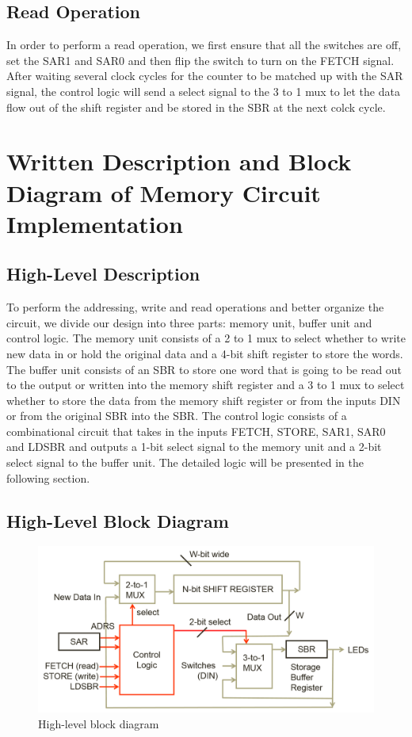 \documentclass[12pt]{article}
\begin{document}
\subsection{\textbf{Read Operation}}
In order to perform a read operation, we first ensure that all the switches are off, set the SAR1 and SAR0 and then flip the switch to turn on the FETCH signal. After waiting several clock cycles for the counter to be matched up with the SAR signal, the control logic will send a select signal to the 3 to 1 mux to let the data flow out of the shift register and be stored in the SBR at the next colck cycle.

\section{Written Description and Block Diagram of Memory Circuit Implementation}
\subsection{\textbf{High-Level Description}}
To perform the addressing, write and read operations and better organize the circuit, we divide our design into three parts: memory unit, buffer unit and control logic. The memory unit consists of a 2 to 1 mux to select whether to write new data in or hold the original data and a 4-bit shift register to store the words. The buffer unit consists of an SBR to store one word that is going to be read out to the output or written into the memory shift register and a 3 to 1 mux to select whether to store the data from the memory shift register or from the inputs DIN or from the original SBR into the SBR. The control logic consists of a combinational circuit that takes in the inputs FETCH, STORE, SAR1, SAR0 and LDSBR and outputs a 1-bit select signal to the memory unit and a 2-bit select signal to the buffer unit. The detailed logic will be presented in the following section.

\subsection{\textbf{High-Level Block Diagram}}
\begin{figure}[H]
    \centering
    \includegraphics[scale=0.5]{high_level_diagram.png}
    \caption{High-level block diagram \cite{GG}}
\end{figure}
\end{document}
